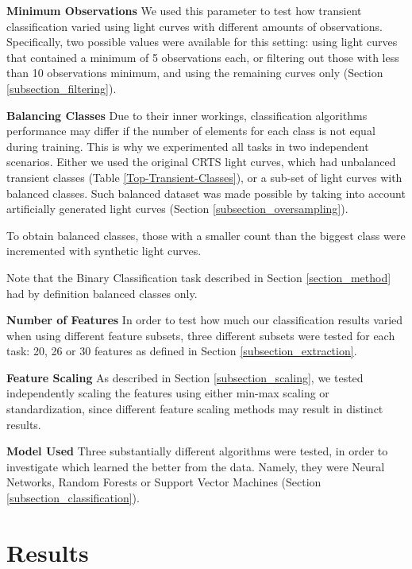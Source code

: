\documentclass[a4paper,fleqn,usenatbib]{mnras}
\begin{document}
\begin{description}
    \item \textbf{Minimum Observations} We used this parameter to test how transient classification varied using light curves with different amounts of observations. Specifically, two possible values were available for this setting: using light curves that contained a minimum of 5 observations each, or filtering out those with less than 10 observations minimum, and using the remaining curves only (Section \ref{subsection_filtering}).
    \item \textbf{Balancing Classes} Due to their inner workings, classification algorithms performance may differ if the number of elements for each class is not equal during training. This is why we experimented all tasks in two independent scenarios. Either we used the original CRTS light curves, which had unbalanced transient classes (Table \ref{Top-Transient-Classes}), or a sub-set of light curves with balanced classes. Such balanced dataset was made possible by taking into account artificially generated light curves (Section \ref{subsection_oversampling}). 
    
    To obtain balanced classes, those with a smaller count than the biggest class were incremented with synthetic light curves.
    
    Note that the Binary Classification task described in Section \ref{section_method} had by definition balanced classes only.
    
    \item \textbf{Number of Features} In order to test how much our classification results varied when using different feature subsets, three different subsets were tested for each task: 20, 26 or 30 features as defined in Section \ref{subsection_extraction}.
    \item \textbf{Feature Scaling} As described in Section \ref{subsection_scaling}, we tested independently scaling the features using either min-max scaling or standardization, since different feature scaling methods may result in distinct results.
    \item \textbf{Model Used} Three substantially different algorithms were tested, in order to investigate which learned the better from the data. Namely, they were Neural Networks, Random Forests or Support Vector Machines (Section \ref{subsection_classification}).
\end{description}

\section{Results}
\label{section_results}
\end{document}
